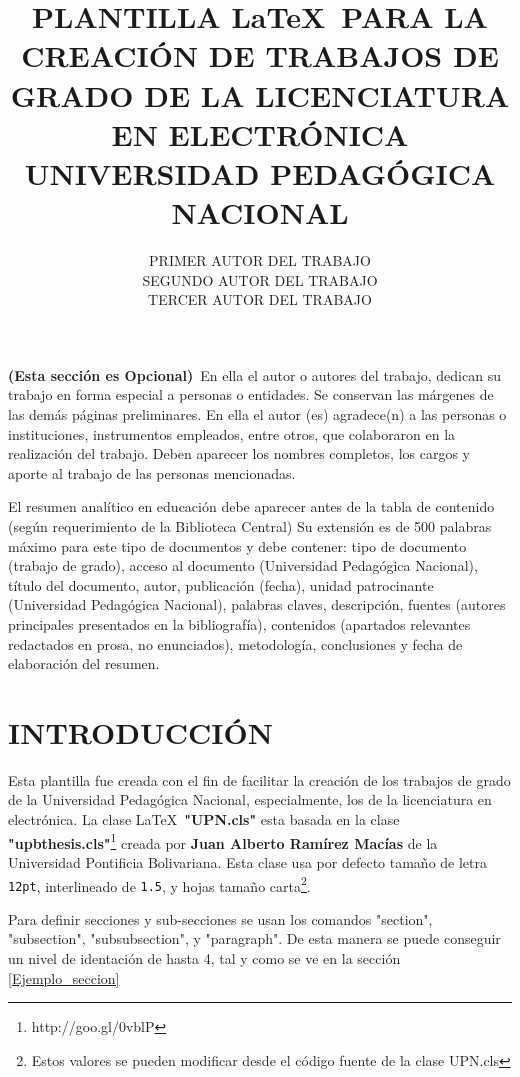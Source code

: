 \documentclass[]{UPN}
\title{PLANTILLA \LaTeX ~PARA LA CREACIÓN DE TRABAJOS DE GRADO DE LA LICENCIATURA EN ELECTRÓNICA UNIVERSIDAD PEDAGÓGICA NACIONAL}
\author{PRIMER AUTOR DEL TRABAJO\\SEGUNDO AUTOR DEL TRABAJO\\TERCER AUTOR DEL TRABAJO}
\begin{document}
\portada
\aprobacion

\begin{agradecimientos}
\textbf{(Esta sección es Opcional)}~En ella el autor o autores del trabajo, dedican su  trabajo en forma especial a personas o entidades. Se 
conservan las márgenes de las demás páginas preliminares. 
En ella el autor (es) agradece(n) a las personas o instituciones, instrumentos empleados, entre otros, que 
colaboraron en la realización del trabajo. Deben aparecer los nombres completos, los cargos y aporte al 
trabajo de las personas mencionadas.
\end{agradecimientos}

\begin{RAE}
El resumen analítico en educación debe aparecer antes de la tabla de contenido (según requerimiento de la 
Biblioteca Central) Su extensión es de 500 palabras máximo para este tipo de documentos y debe contener: 
tipo de documento (trabajo de grado), acceso al documento (Universidad Pedagógica Nacional), título del 
documento, autor, publicación (fecha), unidad patrocinante (Universidad Pedagógica Nacional), palabras
claves, descripción, fuentes (autores principales presentados en la bibliografía), contenidos (apartados 
relevantes redactados en prosa, no enunciados), metodología, conclusiones y fecha de elaboración del 
resumen.
\end{RAE}

\tabladecontenido
\listadefiguras
\listadetablas

\section{INTRODUCCIÓN}
Esta plantilla fue creada con el fin de facilitar la creación de los trabajos de grado de la Universidad Pedagógica Nacional, especialmente, los de la licenciatura en electrónica. La clase \LaTeX~\textbf{"UPN.cls"} esta basada en la clase \textbf{"upbthesis.cls"}\footnote{http://goo.gl/0vblP} creada por \textbf{Juan Alberto Ramírez Macías} de la Universidad Pontificia Bolivariana. Esta clase usa por defecto tamaño de letra {\tt 12pt}, interlineado de {\tt 1.5}, y hojas tamaño carta\footnote{Estos valores se pueden modificar desde el código fuente de la clase UPN.cls}.

Para definir secciones y sub-secciones se usan los comandos "section", "subsection", "subsubsection", y  "paragraph". De esta manera se puede conseguir un nivel de identación de hasta 4, tal y como se ve en la sección \ref{Ejemplo_seccion}
\end{document}
